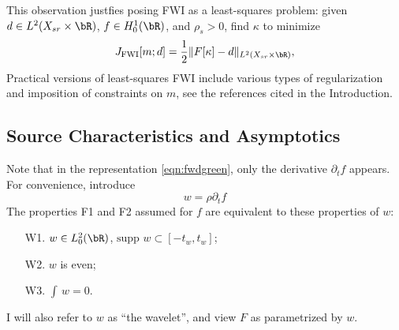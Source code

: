 This observation justfies posing FWI as a least-squares problem: given $d \in
L^2(X_{sr}\times \bR)$, $f \in H^1_0(\bR)$, and $\rho_s>0$, find $\kappa$ to minimize
\begin{equation}
  \label{eqn:fwi}
  J_{\rm FWI}[m;d]= \frac{1}{2}\|F[\kappa]-d\|_{L^2(X_{sr} \times \bR)},
\end{equation}
Practical versions of least-squares FWI include various types of regularization and
imposition of constraints on $m$, see the references cited in the
Introduction.

\subsection{Source Characteristics and Asymptotics}

Note that in the representation \ref{eqn:fwdgreen}, only the
derivative $\partial_tf$ appears. For convenience, introduce
\begin{equation}
  \label{eqn:wavelet}
  w = \rho \partial_t f
\end{equation}
The properties F1 and F2 assumed for $f$ are equivalent to these
properties of $w$:
\begin{itemize}
\item[W1. ] $w \in L^2_0(\bR)$, $\mbox{supp }w \subset [-t_w,t_w]$;
\item[W2. ] $w$ is even;
\item[W3. ] $\int \, w = 0$.
\end{itemize}
I will also
refer to $w$ as ``the wavelet'', and view $F$ as parametrized by $w$.

